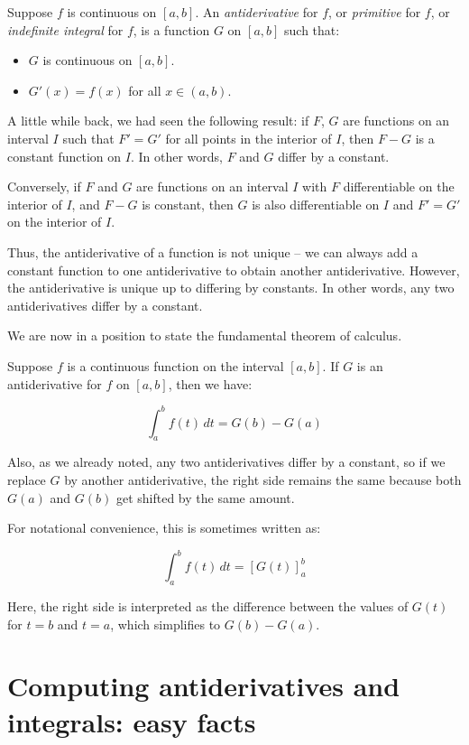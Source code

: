 \documentclass[10pt]{amsart}
\begin{document}
Suppose $f$ is continuous on $[a,b]$. An {\em antiderivative} for $f$,
or {\em primitive} for $f$, or {\em indefinite integral} for $f$, is a
function $G$ on $[a,b]$ such that:

\begin{itemize}
\item $G$ is continuous on $[a,b]$.
\item $G'(x) = f(x)$ for all $x \in (a,b)$.
\end{itemize}

A little while back, we had seen the following result: if $F$, $G$ are
functions on an interval $I$ such that $F' = G'$ for all points in the
interior of $I$, then $F - G$ is a constant function on $I$. In other
words, $F$ and $G$ differ by a constant.

Conversely, if $F$ and $G$ are functions on an interval $I$ with $F$
differentiable on the interior of $I$, and $F - G$ is constant, then
$G$ is also differentiable on $I$ and $F' = G'$ on the interior of $I$.

Thus, the antiderivative of a function is not unique -- we can always
add a constant function to one antiderivative to obtain another
antiderivative. However, the antiderivative is unique up to differing
by constants. In other words, any two antiderivatives differ by a
constant.

We are now in a position to state the fundamental theorem of calculus.

Suppose $f$ is a continuous function on the interval $[a,b]$. If $G$
is an antiderivative for $f$ on $[a,b]$, then we have:

$$\int_a^b f(t) \, dt = G(b) - G(a)$$

Also, as we already noted, any two antiderivatives differ by a
constant, so if we replace $G$ by another antiderivative, the right
side remains the same because both $G(a)$ and $G(b)$ get shifted by
the same amount.

For notational convenience, this is sometimes written as:

$$\int_a^b f(t) \, dt = [G(t)]_a^b$$

Here, the right side is interpreted as the difference between the
values of $G(t)$ for $t = b$ and $t = a$, which simplifies to $G(b) -
G(a)$.

\section{Computing antiderivatives and integrals: easy facts}
\end{document}
